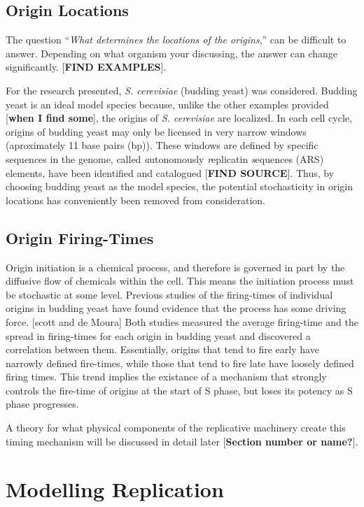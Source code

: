 		\subsection{Origin Locations}
		
		The question ``\emph{What determines the locations of the origins},'' can be difficult to answer.
		Depending on what organism your discussing, the answer can change significantly.
		[\textbf{FIND EXAMPLES}].
		
		For the research presented, \emph{S. cerevisiae} (budding yeast) was considered.
		Budding yeast is an ideal model species because, unlike the other examples provided [\textbf{when I find some}], the origins of \emph{S. cerevisiae} are localized.
		In each cell cycle, origins of budding yeast may only be licensed in very narrow windows (aproximately 11 base pairs (bp)).
		These windows are defined by specific sequences in the genome, called \emph{a}utonomously \emph{r}eplicatin \emph{s}equences (ARS) elements, have been identified and catalogued [\textbf{FIND SOURCE}].
		Thus, by choosing budding yeast as the model species, the potential stochasticity in origin locations has conveniently been removed from consideration.
		
		\subsection{Origin Firing-Times}
		
		Origin initiation is a chemical process, and therefore is governed in part by the diffusive flow of chemicals within the cell.
		This means the initiation process must be stochastic at some level.
		Previous studies of the firing-times of individual origins in budding yeast have found evidence that the process has some driving force. [scott and de Moura]
		Both studies measured the average firing-time and the spread in firing-times for each origin in budding yeast and discovered a correlation between them.
		Essentially, origins that tend to fire early have narrowly defined fire-times, while those that tend to fire late have loosely defined firing times.
		This trend implies the existance of a mechanism that strongly controls the fire-time of origins at the start of S phase, but loses its potency as S phase progresses.
		
		A theory for what physical components of the replicative machinery create this timing mechanism will be discussed in detail later [\textbf{Section number or name?}].
		
		
	\section{Modelling Replication}
	
